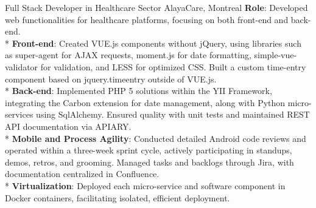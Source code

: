 \documentclass[
  a4paper,
   maincolor=cvblue,
   sectioncolor=cvblue,
]{fortysecondscv}
\begin{document}
\newpage
\makebacksidebar



\begin{cvtable}
    {Full Stack Developer in Healthcare Sector}
    {AlayaCare, Montreal}
    {
      \textbf{Role}: Developed web functionalities for healthcare platforms, focusing on both front-end and back-end.\\
      * \textbf{Front-end}: Created VUE.js components without jQuery, using libraries such as super-agent for AJAX requests, moment.js for date formatting, simple-vue-validator for validation, and LESS for optimized CSS. Built a custom time-entry component based on jquery.timeentry outside of VUE.js.\\
      * \textbf{Back-end}: Implemented PHP 5 solutions within the YII Framework, integrating the Carbon extension for date management, along with Python micro-services using SqlAlchemy. Ensured quality with unit tests and maintained REST API documentation via APIARY.\\
      * \textbf{Mobile and Process Agility}: Conducted detailed Android code reviews and operated within a three-week sprint cycle, actively participating in standups, demos, retros, and grooming. Managed tasks and backlogs through Jira, with documentation centralized in Confluence.\\
      * \textbf{Virtualization}: Deployed each micro-service and software component in Docker containers, facilitating isolated, efficient deployment.\\
    }
\end{cvtable}
\end{document}
